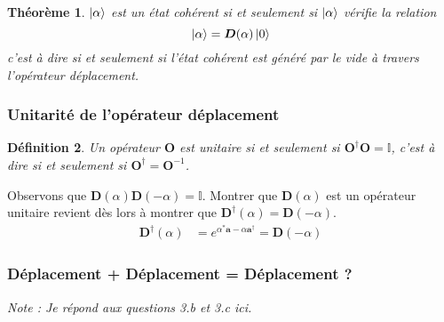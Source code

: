 \documentclass[11pt,oneside,a4paper]{article}
\newtheorem{theorem}{Théorème}[section]
\newtheorem{definition}[theorem]{Définition}
\begin{document}
\begin{theorem}
  $\ket{\alpha}$ est un état cohérent si et seulement si $\ket{\alpha}$ vérifie la relation
  \begin{equation*}
    \ket{\alpha}=\bm{D}(\alpha)\ket{0}
  \end{equation*}
  c'est à dire si et seulement si l'état cohérent est généré par le vide à travers l'opérateur déplacement.
\end{theorem}

\subsubsection{Unitarité de l'opérateur déplacement}

\begin{definition}
  Un opérateur $\bm{O}$ est unitaire si et seulement si $\bm{O}^\dagger\bm{O} = \mathbb{I}$, c'est à dire si et seulement si $\bm{O}^\dagger = \bm{O}^{-1}$.
\end{definition}

Observons que $\bm{D}(\alpha)\bm{D}(-\alpha) = \mathbb{I}$. Montrer que $\bm{D}(\alpha)$ est un opérateur unitaire revient dès lors à montrer que $\bm{D}^\dagger(\alpha) = \bm{D}(-\alpha)$.
\begin{align*}
  \bm{D}^\dagger(\alpha) &= e^{\alpha^*\bm{a}-\alpha\bm{a}^\dagger} = \bm{D}(-\alpha) 
\end{align*}

\subsubsection{Déplacement + Déplacement = Déplacement ?}
\emph{Note : Je répond aux questions 3.b et 3.c ici.}
\end{document}
